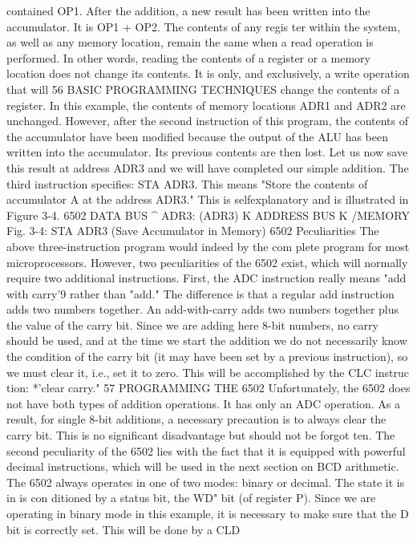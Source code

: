 contained OP1. After the addition, a new result has been written
into the accumulator. It is OP1 + OP2. The contents of any regis
ter within the system, as well as any memory location, remain the
same when a read operation is performed. In other words, reading
the contents of a register or a memory location does not change its
contents. It is only, and exclusively, a write operation that will
56
BASIC PROGRAMMING TECHNIQUES
change the contents of a register. In this example, the contents of
memory locations ADR1 and ADR2 are unchanged. However,
after the second instruction of this program, the contents of the
accumulator have been modified because the output of the ALU
has been written into the accumulator. Its previous contents are
then lost.
Let us now save this result at address ADR3 and we will have
completed our simple addition.
The third instruction specifies: STA ADR3. This means "Store
the contents of accumulator A at the address ADR3." This is selfexplanatory
and is illustrated in Figure 3-4.
6502
DATA BUS ^
ADR3:
(ADR3) K
ADDRESS BUS K
/MEMORY
Fig. 3-4: STA ADR3 (Save Accumulator in Memory)
6502 Peculiarities
The above three-instruction program would indeed by the com
plete program for most microprocessors. However, two
peculiarities of the 6502 exist, which will normally require two
additional instructions.
First, the ADC instruction really means "add with carry'9
rather than "add." The difference is that a regular add instruction
adds two numbers together. An add-with-carry adds two numbers
together plus the value of the carry bit. Since we are adding here
8-bit numbers, no carry should be used, and at the time we start
the addition we do not necessarily know the condition of the carry
bit (it may have been set by a previous instruction), so we must clear
it, i.e., set it to zero. This will be accomplished by the CLC instruc
tion: *'clear carry."
57
PROGRAMMING THE 6502
Unfortunately, the 6502 does not have both types of addition
operations. It has only an ADC operation. As a result, for single
8-bit additions, a necessary precaution is to always clear the carry
bit. This is no significant disadvantage but should not be forgot
ten.
The second peculiarity of the 6502 lies with the fact that it is
equipped with powerful decimal instructions, which will be used
in the next section on BCD arithmetic. The 6502 always operates
in one of two modes: binary or decimal. The state it is in is con
ditioned by a status bit, the WD" bit (of register P). Since we are
operating in binary mode in this example, it is necessary to make
sure that the D bit is correctly set. This will be done by a CLD
